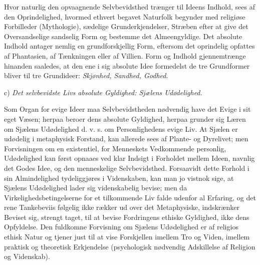 \documentclass[11pt]{book}
\newcommand{\opage}[1]{\marginnote{\footnotesize\textit{[#1]}}}
\begin{document}
Hvor naturlig den opvaagnende Selvbevidsthed trænger til Ideens
Indhold, sees af den Oprindelighed, hvormed ethvert begavet Naturfolk
begynder med religiøse Forbilleder (Mythologie), sædelige
Grunderkjendelser, Stræben efter at give det Oversandselige sandselig
Form og bestemme det Almeengyldige. Det absolute Indhold antager
nemlig en grundforskjellig
\opage{276} \setcounter{footnote}{0}%
Form, eftersom det oprindelig opfattes
af Phantasien, af Tænkningen eller af Villien. Form og Indhold
gjennemtrænge hinanden saaledes, at den ene i sig absolute Idee
formedelst de tre Grundformer bliver til tre Grundideer:
\emph{Skjønhed, Sandhed, Godhed}.

c) \emph{Det selvbevidste Livs absolute Gyldighed: Sjælens
Udødelighed.}

Som Organ for evige Ideer maa Selvbevidstheden nødvendig have det
Evige i sit eget Væsen; herpaa beroer dens absolute Gyldighed, herpaa
grunder sig Læren om Sjælens Udødelighed d. v. s. om Personlighedens
evige Liv. At Sjælen er udødelig i metaphysisk Forstand, kan allerede
sees af Plante- og Dyrelivet; men Forvisningen om en existentiel, for
Menneskets Vedkommende personlig, Udødelighed kan først opnaaes ved
klar Indsigt i Forholdet mellem Ideen, navnlig det Godes Idee, og den
menneskelige Selvbevidsthed. Forsaavidt dette Forhold i sin
Almindelighed tydeliggjøres i Videnskaben, kan man jo vistnok sige, at
Sjælens Udødelighed lader sig videnskabelig bevise; men da
Virkelighedsbetingelserne for et tilkommende Liv falde udenfor al
Erfaring, og det rene Tankebeviis følgelig ikke rækker ud over det
Metaphysiske, indskrænker Beviset sig, strengt taget, til at bevise
Fordringens ethiske Gyldighed, ikke dens Opfyldelse. Den fuldkomne
Forvisning om Sjælens Udødelighed er af religios ethisk Natur og
tjener just til at vise Forskjellen imellem Tro og Viden, imellem
praktisk og theoretisk Erkjendelse (psychologisk nødvendig Adskillelse
af Religion og Videnskab).
\end{document}
